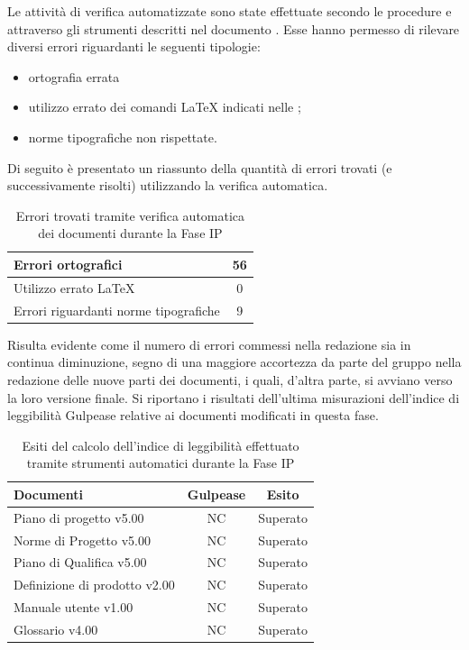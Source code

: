 	Le attività di verifica automatizzate sono state effettuate secondo le procedure e attraverso gli strumenti descritti nel documento . Esse hanno permesso di rilevare diversi errori riguardanti le seguenti tipologie:
	\begin{itemize}
	\item ortografia errata
	\item utilizzo errato dei comandi \LaTeX{} indicati nelle ;
	\item norme tipografiche non rispettate.
	\end{itemize}
	Di seguito è presentato un riassunto della quantità di errori trovati (e successivamente risolti) utilizzando la verifica automatica.
	\begin{table}[H]
		\centering
			\begin{tabu}{| l | c |}
				\hline
				Errori ortografici	& 56	\\ \hline
				Utilizzo errato \LaTeX{}	& 0	\\ \hline
				Errori riguardanti norme tipografiche	& 9	\\ \hline
			\end{tabu}
		\caption{Errori trovati tramite verifica automatica dei documenti durante la Fase IP}
	\end{table}

	Risulta evidente come il numero di errori commessi nella redazione sia in continua diminuzione, segno di una maggiore accortezza da parte del gruppo nella redazione delle nuove parti dei documenti, i quali, d'altra parte, si avviano verso la loro versione finale.
	Si riportano i risultati dell'ultima misurazioni dell'indice di leggibilità Gulpease relative ai documenti modificati in questa fase.

	\begin{table}[H]
		\centering
			\begin{tabu}{| l | c | c |}
				\hline
				Documenti 							& Gulpease	& Esito		\\ \hline \hline
				Piano di progetto v5.00				& NC 		& Superato  \\ \hline
				Norme di Progetto v5.00 			& NC		& Superato  \\ \hline
				Piano di Qualifica v5.00 			& NC		& Superato  \\ \hline
				Definizione di prodotto v2.00		& NC		& Superato \\ \hline
				Manuale utente v1.00				& NC		& Superato \\ \hline
				Glossario v4.00					 	& NC 		& Superato  \\ \hline
			\end{tabu}
		\caption{Esiti del calcolo dell'indice di leggibilità effettuato tramite strumenti automatici durante la Fase IP}
	\end{table}

